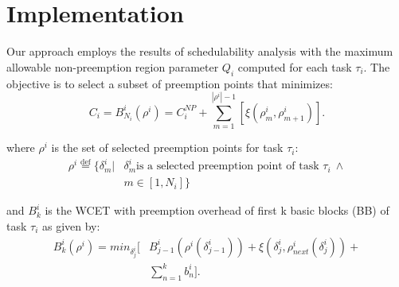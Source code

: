 \section{Implementation}\label{sec:implementation}

Our approach employs the results of schedulability analysis with the maximum allowable non-preemption region parameter \begin{math}Q_{i}\end{math} computed for each task \begin{math}\tau_{i}\end{math}.  The objective is to select a subset of preemption points that minimizes:
\begin{equation}\label{eqn:wcet-cost}
   C_{i} = B_{N_{i}}^{i}(\rho^{i}) = C_{i}^{NP} + \sum_{m=1}^{|\rho^{i}|-1} [\xi(\rho_{m}^{i},\rho_{m+1}^{i})].
\end{equation}

\noindent
where \begin{math}\rho^{i}\end{math} is the set of selected preemption points for task \begin{math}\tau_{i}\end{math}:
\begin{equation}\label{eqn:pp-set}
\begin{split}
   \rho^{i} \stackrel{\text{def}}{=} \{\delta_{m}^{i}|&\delta_{m}^{i} \text{is a selected preemption point of task } \tau_{i}\ \wedge \\ &m \in [1,N_{i}]\}
\end{split}
\end{equation}

\noindent
and \begin{math}B_{k}^{i}\end{math} is the WCET with preemption overhead of first k basic blocks (BB) of task \begin{math}\tau_{i}\end{math} as given by:
\begin{equation}\label{eqn:bbkwcet-cost}
\begin{split}
   B_{k}^{i}(\rho^{i}) = \textit{min}_{\delta_{j}^{i}} \Big[&B_{j-1}^{i}(\rho^{i}(\delta_{j-1}^{i})) + \xi(\delta_{j}^{i},\rho_{next}^{i}(\delta_{j}^{i})) + \\ &\sum_{n=1}^{k}b_{n}^{i}\Big].
\end{split}
\end{equation}

